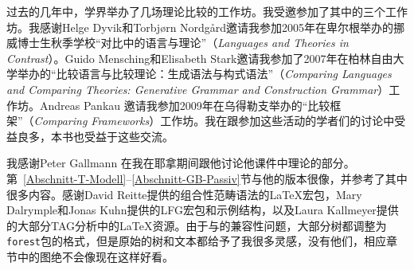 过去的几年中，学界举办了几场理论比较的工作坊。我受邀参加了其中的三个工作坊。我感谢Helge Dyvik和Torbjørn Nordgård邀请我参加2005年在卑尔根举办的挪威博士生秋季学校“对比中的语言与理论”（\emph{Languages and Theories in Contrast}）。Guido Mensching和Elisabeth
Stark邀请我参加了2007年在柏林自由大学举办的“比较语言与比较理论：生成语法与构式语法”（\emph{Comparing Languages and Comparing Theories:
  Generative Grammar and Construction Grammar}）工作坊。Andreas Pankau 邀请我参加2009年在乌得勒支举办的“比较框架”（\emph{Comparing
  Frameworks}）工作坊。我在跟参加这些活动的学者们的讨论中受益良多，本书也受益于这些交流。

我感谢Peter Gallmann 在我在耶拿期间跟他讨论他课件中\gb 理论的部分。第~\ref{Abschnitt-T-Modell}--\ref{Abschnitt-GB-Passiv}节与他的版本很像，并参考了其中很多内容。感谢David Reitte提供的组合性范畴语法的\LaTeX{}宏包，Mary Dalrymple和Jonas Kuhn提供的LFG宏包和示例结构，以及Laura Kallmeyer提供的大部分TAG分析中的\LaTeX{}资源。由于与\XeLaTeX 的兼容性问题，大部分树都调整为\texttt{forest}包的格式，但是原始的树和文本都给予了我很多灵感，没有他们，相应章节中的图绝不会像现在这样好看。

